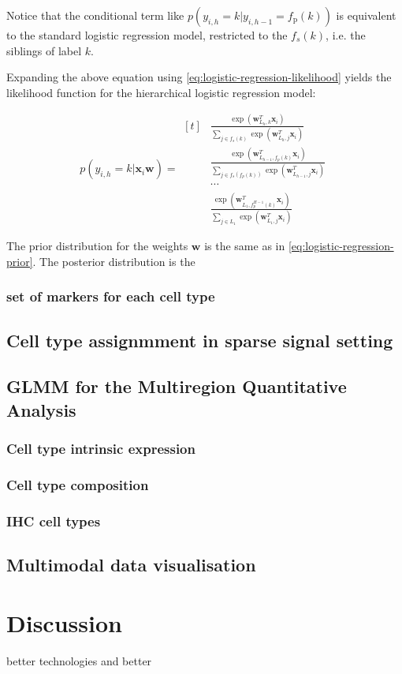 Notice that the conditional term like $p(y_{i,h} = k | y_{i,h-1} = f_{\text{p}}(k))$ is equivalent to the standard logistic regression model, restricted to the $f_s(k)$, i.e. the siblings of label $k$. 

Expanding the above equation using \cref{eq:logistic-regression-likelihood} yields the likelihood function for the hierarchical logistic regression model:

\begin{equation}
    p(y_{i,h} = k | \mathbf{x}_{i} \mathbf{w}) = \begin{aligned}[t]
        & \frac{\exp(\mathbf{w}_{L_h, k}^T \mathbf{x}_i)}{\sum_{j \in f_s(k)} \exp(\mathbf{w}_{L_h, j}^T \mathbf{x}_i)} \\
        & \frac{\exp(\mathbf{w}_{L_{h-1}, f_p(k)}^T \mathbf{x}_i)}{\sum_{j \in  f_s(f_p(k))} \exp(\mathbf{w}_{L_{h-1}, j}^T \mathbf{x}_i)} \\
        & \cdots \\
        & \frac{\exp(\mathbf{w}_{L_1, f_p^{H-1}(k)}^T \mathbf{x}_i)}{\sum_{j \in L_1} \exp(\mathbf{w}_{L_1, j}^T \mathbf{x}_i)}
    \end{aligned}
\end{equation}

The prior distribution for the weights $\mathbf{w}$ is the same as in \cref{eq:logistic-regression-prior}. The posterior distribution is the 

\subsubsection*{set of markers for each cell type} 

\subsection{Cell type assignmment in sparse signal setting}

\subsection{GLMM for the Multiregion Quantitative Analysis}

\subsubsection*{Cell type intrinsic expression}

\subsubsection*{Cell type composition}

\subsubsection*{IHC cell types}

\subsection{Multimodal data visualisation}

\section{Discussion}

better technologies and better 